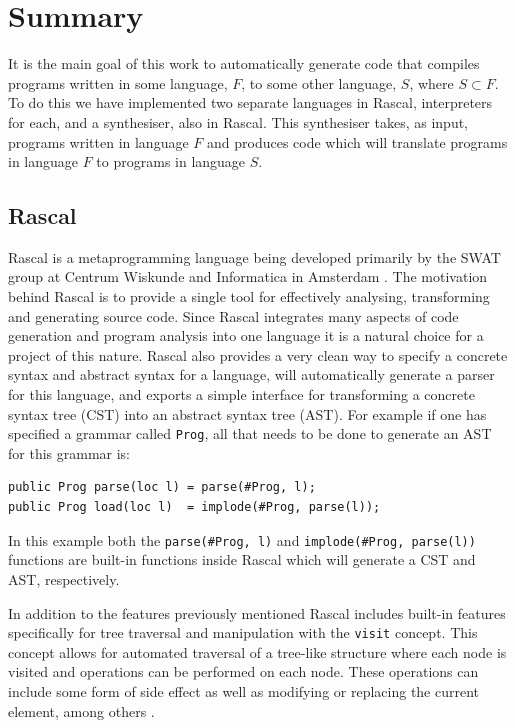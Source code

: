 \documentclass[twoside]{article}
\begin{document}
\section{Summary}
It is the main goal of this work to automatically generate code that
compiles programs written in some language, $F$, to some other
language, $S$, where $S \subset F$. To do this we have implemented two
separate languages in Rascal, interpreters for each, and a
synthesiser, also in Rascal. This synthesiser takes, as input,
programs written in language $F$ and produces code which will
translate programs in language $F$ to programs in language $S$.

\subsection{Rascal}
Rascal is a metaprogramming language being developed primarily by the
SWAT group at Centrum Wiskunde and Informatica in Amsterdam
\cite{rascal}. The motivation behind Rascal is to provide a single
tool for effectively analysing, transforming and generating source
code. Since Rascal integrates many aspects of code generation and
program analysis into 
one language it is a natural choice for a project of this
nature. Rascal also provides a very clean way to specify a concrete
syntax and abstract syntax for a language, will automatically generate
a parser for this language, and exports a simple interface for
transforming a concrete syntax tree (CST) into an abstract syntax tree
(AST). For example if one has specified a grammar called \texttt{Prog},
all that needs to be done to generate an AST for this grammar is:
\begin{lstlisting}
public Prog parse(loc l) = parse(#Prog, l);
public Prog load(loc l)  = implode(#Prog, parse(l));
\end{lstlisting}
In this example both the \texttt{parse(\#Prog, l)} and
\texttt{implode(\#Prog, parse(l))} functions are built-in functions
inside Rascal which will generate a CST and AST, respectively. 

In addition to the features previously mentioned Rascal includes
built-in features specifically for tree traversal and manipulation
with the \texttt{visit} concept. This concept allows for automated
traversal of a tree-like structure where each node is visited and
operations can be performed on each node. These operations can include
some form of side effect as well as modifying or replacing the current
element, among others \cite{rascalvisit}.
\end{document}
